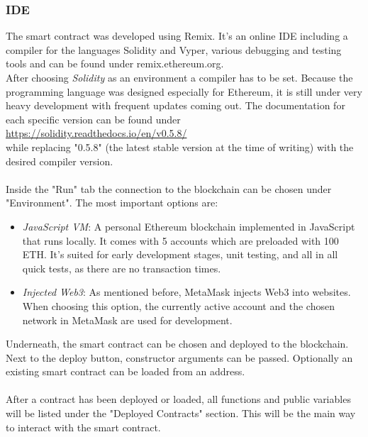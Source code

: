 \subsubsection{IDE}
The smart contract was developed using Remix. It's an online IDE including a compiler for the languages Solidity and Vyper, various debugging and testing tools and can be found under remix.ethereum.org.
\\
After choosing \textit{Solidity} as an environment a compiler has to be set. Because the programming language was designed especially for Ethereum, it is still under very heavy development with frequent updates coming out. The documentation for each specific version can be found under
\\
\url{https://solidity.readthedocs.io/en/v0.5.8/}
\\
while replacing "0.5.8" (the latest stable version at the time of writing) with the desired compiler version.
\\\\
Inside the "Run" tab the connection to the blockchain can be chosen under "Environment". The most important options are:
\begin{itemize}
    \item \textit{JavaScript VM}: A personal Ethereum blockchain implemented in JavaScript that runs locally. It comes with 5 accounts which are preloaded with 100 ETH. It's suited for early development stages, unit testing, and all in all quick tests, as there are no transaction times.
    \item \textit{Injected Web3}: As mentioned before, MetaMask injects Web3 into websites. When choosing this option, the currently active account and the chosen network in MetaMask are used for development.
\end{itemize}
Underneath, the smart contract can be chosen and deployed to the blockchain. Next to the deploy button, constructor arguments can be passed. Optionally an existing smart contract can be loaded from an address.
\\\\
After a contract has been deployed or loaded, all functions and public variables will be listed under the "Deployed Contracts" section. This will be the main way to interact with the smart contract.
\\\\
